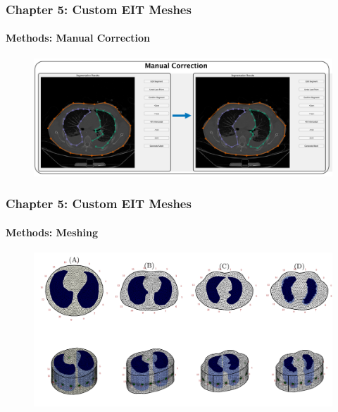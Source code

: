 \documentclass[10pt,    %
    english,            %
    xcolor=table,       %
    envcountsect,        %
    aspectratio=1610
]{beamer}
\begin{document}
\begin{frame}
	\frametitle{Chapter 5: Custom EIT Meshes}
	\framesubtitle{Methods: Manual Correction}    
	\begin{figure}[H]
		\centering
		\includegraphics[width=\textwidth]{lung_segmentation_methods_b.pdf}
	\end{figure}
\end{frame}

\begin{frame}
	\frametitle{Chapter 5: Custom EIT Meshes}
	\framesubtitle{Methods: Meshing}    
	\begin{figure}[H]
		\centering
		\includegraphics[width=\textwidth]{fem_models_PT04.pdf}
	\end{figure}
\end{frame}
\end{document}
